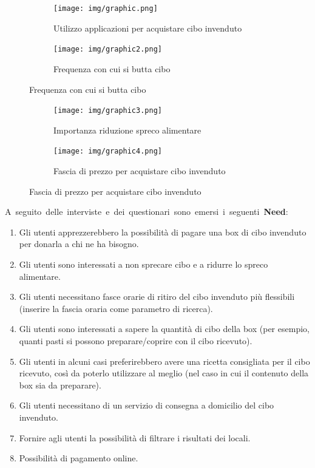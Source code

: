 \documentclass{article}
\begin{document}
\begin{figure}[H]
    \centering
    \begin{subfigure}{0.40\textwidth}
        \centering
        \texttt{[image: img/graphic.png]}
        \caption{Utilizzo applicazioni per acquistare cibo invenduto}
    \end{subfigure}
    \hfill
    \begin{subfigure}{0.40\textwidth}
        \centering
        \texttt{[image: img/graphic2.png]}
        \caption{Frequenza con cui si butta cibo}
    \end{subfigure}
\end{figure}

\begin{figure}[H]
    \centering
    \begin{subfigure}{0.40\textwidth}
        \centering
        \texttt{[image: img/graphic3.png]}
        \caption{Importanza riduzione spreco alimentare}
    \end{subfigure}
    \hfill
    \begin{subfigure}{0.40\textwidth}
        \centering
        \texttt{[image: img/graphic4.png]}
        \caption{Fascia di prezzo per acquistare cibo invenduto}
    \end{subfigure}
\end{figure}

\hbox{A seguito delle interviste e dei questionari sono emersi i seguenti \textbf{Need}:}
\begin{enumerate}[label=\textbf{Need-\arabic*}]
    \item Gli utenti apprezzerebbero la possibilità di pagare una box di cibo invenduto per donarla a chi ne ha bisogno. \label{need1}
    \item Gli utenti sono interessati a non sprecare cibo e a ridurre lo spreco alimentare. \label{need2}
    \item Gli utenti necessitano fasce orarie di ritiro del cibo invenduto più flessibili (inserire la fascia oraria come parametro di ricerca). \label{need3}
    \item Gli utenti sono interessati a sapere la quantità di cibo della box (per esempio, quanti pasti si possono preparare/coprire con il cibo ricevuto). \label{need4}
    \item Gli utenti in alcuni casi preferirebbero avere una ricetta consigliata per il cibo ricevuto, così da poterlo utilizzare al meglio (nel caso in cui il contenuto della box sia da preparare). \label{need5}
    \item Gli utenti necessitano di un servizio di consegna a domicilio del cibo invenduto. \label{need6}
    \item Fornire agli utenti la possibilità di filtrare i risultati dei locali. \label{need7}
    \item Possibilità di pagamento online. \label{need8}
\end{enumerate}
\end{document}
